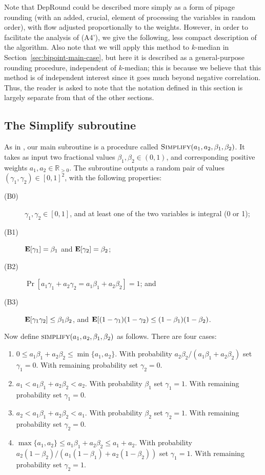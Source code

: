 Note that {\sc DepRound} could be described more simply as a form of pipage rounding (with an added, crucial, element of processing the variables in random order), with flow adjusted proportionally to the weights. However, in order to facilitate the analysis of (A4'), we give the following, less compact description of the algorithm.
Also note that we will apply this method to $k$-median in Section~\ref{sec:bipoint-main-case}, but here it is described as a general-purpose rounding procedure, independent of $k$-median; this is because we believe that this method is of independent interest since it goes much beyond negative correlation. Thus, the reader is asked to note that the notation defined in this section is largely separate from that of the other sections.

\subsection{The {\sc Simplify} subroutine}
\label{sec:simplify}
As in \cite{srin:level-sets}, our main subroutine is a procedure called $\textsc{Simplify}(a_1,a_2,\beta_1,\beta_2)$. It takes as input two fractional values $\beta_1,\beta_2\in(0,1)$, and corresponding positive weights $a_1,a_2\in\mathbb{R}_{>0}$. The subroutine outputs a random pair of values $(\gamma_1,\gamma_2)\in[0,1]^2$, with the following properties:

\begin{description}
\item[(B0)] $\gamma_1,\gamma_2\in[0,1]$, and at least one of the two variables is integral (0 or 1);
\item[(B1)] $\text{\bf E}[\gamma_1]=\beta_1$ and $\text{\bf E}[\gamma_2]=\beta_2$;
\item[(B2)] $\Pr\left[a_1\gamma_1+a_2\gamma_2=a_1\beta_1+a_2\beta_2 \right]=1$; and
\item[(B3)]
$\text{\bf E}[\gamma_1\gamma_2]\le\beta_1\beta_2$, and $\text{\bf E}[(1-\gamma_1)(1-\gamma_2)\le(1-\beta_1)(1-\beta_2)$.
\end{description}

Now define $\text{\sc simplify}(a_1,a_2,\beta_1,\beta_2)$ as follows. 
There are four cases:
\begin{enumerate}
\item $0\le a_1\beta_1+a_2\beta_2 \le\min\{a_1,a_2\}$. With probability $a_2\beta_2/(a_1\beta_1+a_2\beta_2 )$ set $\gamma_1= 0$. With remaining probability set $\gamma_2= 0$.
\item $a_1<a_1\beta_1+a_2\beta_2 <a_2$. With probability $\beta_1$ set $\gamma_1=1$. With remaining probability set $\gamma_1=0$.
\item $a_2<a_1\beta_1+a_2\beta_2 <a_1$. With probability $\beta_2$ set $\gamma_2=1$. With remaining probability set $\gamma_2=0$.
\item $\max\{a_1,a_2\}\le a_1\beta_1+a_2\beta_2 \le a_1+a_2$. With probability $a_2(1-\beta_2)/(a_1(1-\beta_1)+a_2(1-\beta_2))$ set $\gamma_1=1$. With remaining probability set $\gamma_2=1$.
\end{enumerate}

